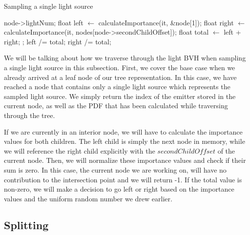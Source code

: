 \begin{algorithm}
	\caption{Sampling a single light source}
	\label{alg:sample1}
	\begin{algorithmic}[1] %
		\State \Return node->lightNum;
		\EndIf
		\State float left $\gets$ calculateImportance(it, \&node[1]);
		\State float right $\gets$ calculateImportance(it, nodes[node->secondChildOffset]);
		\State float total $\gets$ left + right;
		\State {};
		\EndIf
		\State left /= total;
		\State right /= total;
				\State <branch according to importance and sample1D>
		\EndProcedure
	\end{algorithmic}
\end{algorithm}

We will be talking about how we traverse through the light BVH when sampling a single light source in this subsection. First, we cover the base case when we already arrived at a leaf node of our tree representation. In this case, we have reached a node that contains only a single light source which represents the sampled light source. We simply return the index of the emitter stored in the current node, as well as the PDF that has been calculated while traversing through the tree.

If we are currently in an interior node, we will have to calculate the importance values for both children. The left child is simply the next node in memory, while we will reference the right child explicitly with the $secondChildOffset$ of the current node. Then, we will normalize these importance values and check if their sum is zero. In this case, the current node we are working on, will have no contribution to the intersection point and we will return -1. If the total value is non-zero, we will make a decision to go left or right based on the importance values and the uniform random number we drew earlier.

\subsection{Splitting}
\label{subs:split}